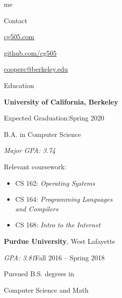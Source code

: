 \begin{minipage}[t]{0.305\textwidth}
  {\Huge me \phantom{my work}}

  \vspace{10pt}

  {\sectionfont Contact}
  \vspace{5pt}
  \begin{adjustwidth}{10pt}{}
    \href{https://cg505.com/}{cg505.com}

    \href{https://github.com/cg505/}{github.com/cg505}


    \href{mailto:cooperc@berkeley.edu}{cooperc@berkeley.edu}
  \end{adjustwidth}

  \vspace{10pt}

  {\sectionfont Education}

  \vspace{5pt}
  \textbf{University of California, Berkeley}%
  \vspace{2pt}
  \begin{adjustwidth}{10pt}{}
    Expected Graduation:\hfill{}Spring 2020

    B.A. in Computer Science


    \emph{Major GPA: 3.74}

    Relevant coursework:
    \begin{itemize}[leftmargin=*]
    \item CS 162: \emph{Operating Systems}
    \item CS 164: \emph{Programming Languages}\\\phantom{CS 164: }\emph{and Compilers}
    \item CS 168: \emph{Intro to the Internet}
    \end{itemize}
  \end{adjustwidth}

  \vspace{5pt}
  \textbf{Purdue University}, West Lafayette
  \vspace{2pt}
  \begin{adjustwidth}{10pt}{}
    \emph{GPA: 3.81}\hfill{}Fall 2016 -- Spring 2018

    Pursued B.S. degrees in

    \enskip Computer Science and Math


\end{adjustwidth}
\end{minipage}
